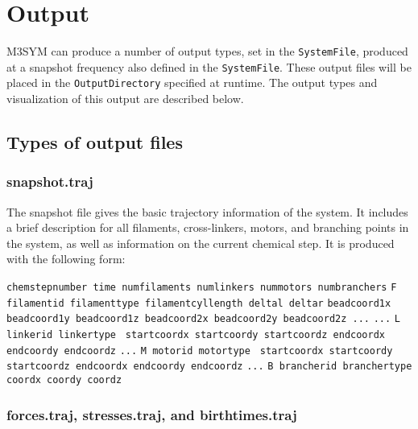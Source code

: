 \documentclass[11pt, oneside]{article}   	%
\begin{document}
\section {Output}

M3SYM can produce a number of output types, set in the \texttt{SystemFile}, produced at a snapshot frequency also defined in the \texttt{SystemFile}. These output files will be placed in the \texttt{OutputDirectory} specified at runtime. The output types and visualization of this output are described below.

\subsection{Types of output files}
\subsubsection{snapshot.traj}
The snapshot file gives the basic trajectory information of the system. It includes a brief description for all filaments, cross-linkers, motors, and branching points in the system, as well as information on the current chemical step. It is produced with the following form:\newline

\noindent\texttt{chemstepnumber time numfilaments numlinkers nummotors numbranchers}\newline
\texttt{F filamentid filamenttype filamentcyllength deltal deltar}\newline
\texttt{beadcoord1x beadcoord1y beadcoord1z beadcoord2x beadcoord2y beadcoord2z ...}\newline
\texttt{...}\newline
\texttt{L linkerid linkertype }\newline
\texttt{startcoordx startcoordy startcoordz endcoordx endcoordy endcoordz}\newline
\texttt{...}\newline
\texttt{M motorid motortype }\newline
\texttt{startcoordx startcoordy startcoordz endcoordx endcoordy endcoordz}\newline
\texttt{...}\newline
\texttt{B brancherid branchertype }\newline
\texttt{coordx coordy coordz}\newline

\subsubsection{forces.traj, stresses.traj, and birthtimes.traj}
\end{document}
